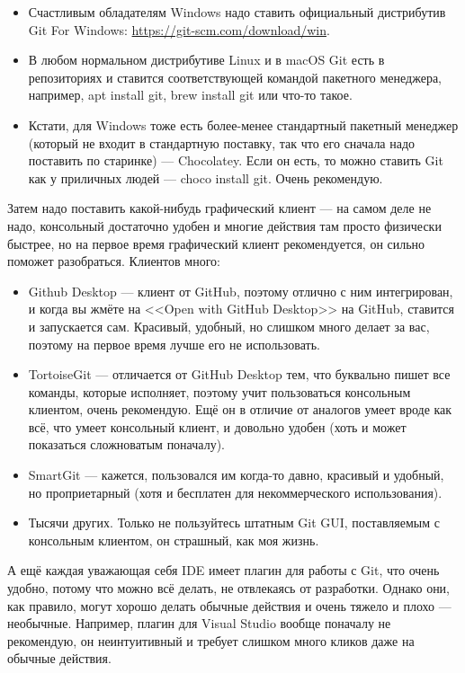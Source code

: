 \documentclass{../../text-style}
\begin{document}
\begin{itemize}
    \item Счастливым обладателям Windows надо ставить официальный дистрибутив Git For Windows: \url{https://git-scm.com/download/win}.
    \item В любом нормальном дистрибутиве Linux и в macOS Git есть в репозиториях и ставится соответствующей командой пакетного менеджера, например, apt install git, brew install git или что-то такое.
    \item Кстати, для Windows тоже есть более-менее стандартный пакетный менеджер (который не входит в стандартную поставку, так что его сначала надо поставить по старинке) --- Chocolatey. Если он есть, то можно ставить Git как у приличных людей --- choco install git. Очень рекомендую.
\end{itemize}

Затем надо поставить какой-нибудь графический клиент --- на самом деле не надо, консольный достаточно удобен и многие действия там просто физически быстрее, но на первое время графический клиент рекомендуется, он сильно поможет разобраться. Клиентов много:

\begin{itemize}
    \item Github Desktop --- клиент от GitHub, поэтому отлично с ним интегрирован, и когда вы жмёте на <<Open with GitHub Desktop>> на GitHub, ставится и запускается сам. Красивый, удобный, но слишком много делает за вас, поэтому на первое время лучше его не использовать.
    \item TortoiseGit --- отличается от GitHub Desktop тем, что буквально пишет все команды, которые исполняет, поэтому учит пользоваться консольным клиентом, очень рекомендую. Ещё он в отличие от аналогов умеет вроде как всё, что умеет консольный клиент, и довольно удобен (хоть и может показаться сложноватым поначалу).
    \item SmartGit --- кажется, пользовался им когда-то давно, красивый и удобный, но проприетарный (хотя и бесплатен для некоммерческого использования).
    \item Тысячи других. Только не пользуйтесь штатным Git GUI, поставляемым с консольным клиентом, он страшный, как моя жизнь.
\end{itemize}

А ещё каждая уважающая себя IDE имеет плагин для работы с Git, что очень удобно, потому что можно всё делать, не отвлекаясь от разработки. Однако они, как правило, могут хорошо делать обычные действия и очень тяжело и плохо --- необычные. Например, плагин для Visual Studio вообще поначалу не рекомендую, он неинтуитивный и требует слишком много кликов даже на обычные действия. 
\end{document}
